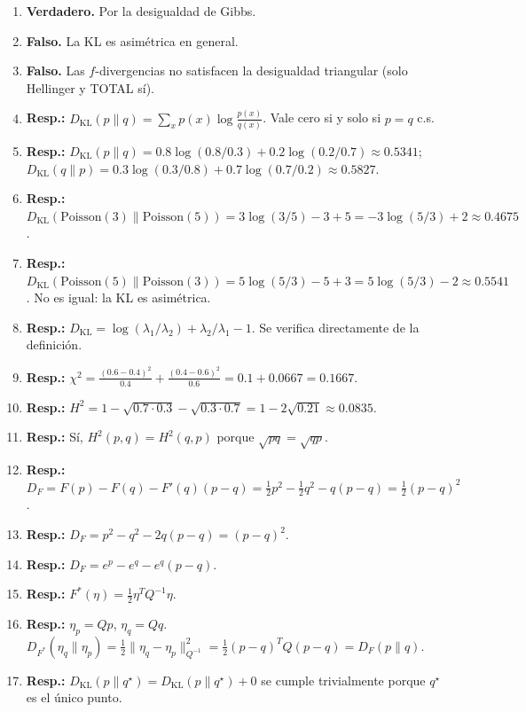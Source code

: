 \begin{enumerate}
	\item \textbf{Verdadero.} Por la desigualdad de Gibbs.
	\item \textbf{Falso.} La KL es asimétrica en general.
	\item \textbf{Falso.} Las $f$-divergencias no satisfacen la desigualdad triangular (solo Hellinger y TOTAL sí).
	\item \textbf{Resp.:} $D_{\mathrm{KL}}(p \| q) = \sum_x p(x)\log\frac{p(x)}{q(x)}$.  Vale cero si y solo si $p = q$ c.s.
	\item \textbf{Resp.:} $D_{\mathrm{KL}}(p \| q) = 0.8\log(0.8/0.3) + 0.2\log(0.2/0.7) \approx 0.5341$; $D_{\mathrm{KL}}(q \| p) = 0.3\log(0.3/0.8) + 0.7\log(0.7/0.2) \approx 0.5827$.
	\item \textbf{Resp.:} $D_{\mathrm{KL}}(\mathrm{Poisson}(3) \| \mathrm{Poisson}(5)) = 3\log(3/5) - 3 + 5 = -3\log(5/3) + 2 \approx 0.4675$.
	\item \textbf{Resp.:} $D_{\mathrm{KL}}(\mathrm{Poisson}(5) \| \mathrm{Poisson}(3)) = 5\log(5/3) - 5 + 3 = 5\log(5/3) - 2 \approx 0.5541$.  No es igual: la KL es asimétrica.
	\item \textbf{Resp.:} $D_{\mathrm{KL}} = \log(\lambda_1/\lambda_2) + \lambda_2/\lambda_1 - 1$.  Se verifica directamente de la definición.
	\item \textbf{Resp.:} $\chi^2 = \frac{(0.6-0.4)^2}{0.4} + \frac{(0.4-0.6)^2}{0.6} = 0.1 + 0.0667 = 0.1667$.
	\item \textbf{Resp.:} $H^2 = 1 - \sqrt{0.7 \cdot 0.3} - \sqrt{0.3 \cdot 0.7} = 1 - 2\sqrt{0.21} \approx 0.0835$.
	\item \textbf{Resp.:} Sí, $H^2(p,q) = H^2(q,p)$ porque $\sqrt{pq} = \sqrt{qp}$.
	\item \textbf{Resp.:} $D_F = F(p) - F(q) - F'(q)(p-q) = \frac{1}{2}p^2 - \frac{1}{2}q^2 - q(p-q) = \frac{1}{2}(p-q)^2$.
	\item \textbf{Resp.:} $D_F = p^2 - q^2 - 2q(p-q) = (p-q)^2$.
	\item \textbf{Resp.:} $D_F = e^p - e^q - e^q(p-q)$.
	\item \textbf{Resp.:} $F^*(\eta) = \frac{1}{2}\eta^T Q^{-1}\eta$.
	\item \textbf{Resp.:} $\eta_p = Qp$, $\eta_q = Qq$.  $D_{F^*}(\eta_q \| \eta_p) = \frac{1}{2}\|\eta_q - \eta_p\|^2_{Q^{-1}} = \frac{1}{2}(p-q)^T Q (p-q) = D_F(p \| q)$.
	\item \textbf{Resp.:} $D_{\mathrm{KL}}(p \| q^\star) = D_{\mathrm{KL}}(p \| q^\star) + 0$ se cumple trivialmente porque $q^\star$ es el único punto.

\end{enumerate}
